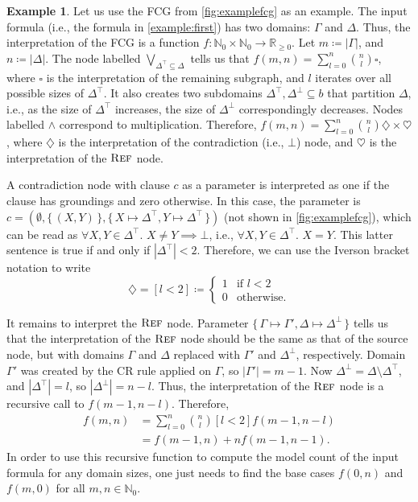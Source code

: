 \documentclass[letterpaper]{article} %
\DeclareMathOperator{\Reff}{\textsc{Ref}}
\theoremstyle{definition}
\newtheorem{example}{Example}
\begin{document}
\begin{example}\label{example:interpretation}
  Let us use the FCG from \cref{fig:examplefcg} as an example. The input formula
  (i.e., the formula in \cref{example:first}) has two domains: $\Gamma$ and
  $\Delta$. Thus, the interpretation of the FCG is a function
  $f\colon \mathbb{N}_{0} \times \mathbb{N}_{0} \to \mathbb{R}_{\ge 0}$. Let
  $m \coloneqq |\Gamma|$, and $n \coloneqq |\Delta|$. The node labelled
  $\bigvee_{\Delta^{\top} \subseteq \Delta}$ tells us that
  $f(m, n) = \sum_{l = 0}^{n} \binom{n}{l} \square$, where $\square$ is the
  interpretation of the remaining subgraph, and $l$ iterates over all possible
  sizes of $\Delta^{\top}$. It also creates two subdomains
  $\Delta^{\top}, \Delta^{\bot} \subseteq b$ that partition $\Delta$, i.e., as
  the size of $\Delta^{\top}$ increases, the size of $\Delta^{\bot}$
  correspondingly decreases. Nodes labelled $\land$ correspond to
  multiplication. Therefore,
  $f(m, n) = \sum_{l = 0}^{n} \binom{n}{l} \diamondsuit \times \heartsuit$,
  where $\diamondsuit$ is the interpretation of the contradiction (i.e., $\bot$)
  node, and $\heartsuit$ is the interpretation of the $\Reff$ node.

  A contradiction node with clause $c$ as a parameter is interpreted as one if
  the clause has groundings and zero otherwise. In this case, the parameter is
  $c = (\emptyset, \{\, (X, Y) \,\}, \{\, X \mapsto \Delta^\top, Y \mapsto \Delta^\top \,\})$
  (not shown in \cref{fig:examplefcg}), which can be read as
  $\forall X, Y \in \Delta^{\top}\text{. }X \ne Y \implies \bot$, i.e.,
  $\forall X, Y \in \Delta^{\top}\text{. }X = Y$. This latter sentence is true
  if and only if $|\Delta^{\top}| < 2$. Therefore, we can use the Iverson
  bracket notation to write
  \[
    \diamondsuit = [l < 2] \coloneqq
    \begin{cases}
      1 & \text{if } l < 2 \\
      0 & \text{otherwise.}
    \end{cases}
  \]

  It remains to interpret the $\Reff$ node. Parameter
  $\{\, \Gamma \mapsto \Gamma', \Delta \mapsto \Delta^\bot \,\}$ tells us that
  the interpretation of the $\Reff$ node should be the same as that of the
  source node, but with domains $\Gamma$ and $\Delta$ replaced with $\Gamma'$
  and $\Delta^{\bot}$, respectively. Domain $\Gamma'$ was created by the CR rule
  applied on $\Gamma$, so $|\Gamma'| = m - 1$. Now
  $\Delta^{\bot} = \Delta \setminus \Delta^{\top}$, and $|\Delta^{\top}| = l$,
  so $|\Delta^{\bot}| = n - l$. Thus, the interpretation of the $\Reff$ node is
  a recursive call to $f(m - 1, n - l)$. Therefore,
  \begin{align}
    f(m, n) &= \sum_{l = 0}^{n} \binom{n}{l} [l < 2] f(m-1, n-l)\nonumber \\
            &= f(m-1, n) + n f(m-1, n-1).\label{eq:solution}
  \end{align}
  In order to use this recursive function to compute the model count of the
  input formula for any domain sizes, one just needs to find the base cases
  $f(0, n)$ and $f(m, 0)$ for all $m, n \in \mathbb{N}_{0}$.
\end{example}
\end{document}

